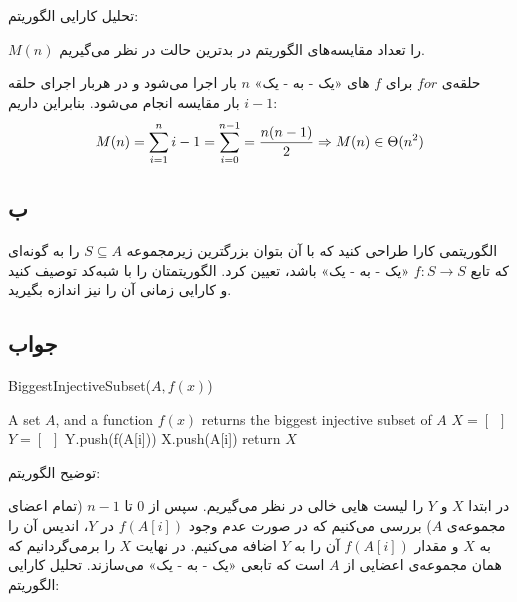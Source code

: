 \documentclass[]{article}
\begin{document}
    تحلیل کارایی الگوریتم:
    
    $M(n)$
    را تعداد مقایسه‌های الگوریتم در بدترین حالت در نظر می‌گیریم.
    
    حلقه‌ی 
    $for$
    برای 
    $f$
    های «یک - به - یک»
    $n$
    بار اجرا می‌شود و در هربار اجرای حلقه 
    $i-1$
    بار مقایسه انجام می‌شود. بنابراین داریم:
    $$\displaystyle M(n) = \sum_{i=1}^n i - 1 = \sum_{i=0}^{n-1} = \frac{n(n-1)}{2}\\
    \Rightarrow M(n) \in \Theta(n^2)$$
    
    
    \pagebreak
    \subsection{ب}
    الگوریتمی کارا طراحی کنید که با آن بتوان بزرگترین زیرمجموعه 
    $S \subseteq A$
    را به گونه‌ای که تابع
    $f: S \rightarrow S$
    «یک - به - یک» باشد، تعیین کرد. الگوریتمتان را با شبه‌کد توصیف کنید و کارایی زمانی آن را نیز اندازه بگیرید.
    \subsection*{جواب}
    \begin{latin}
        \begin{algorithm}
        \caption{BiggestInjectiveSubset($A, f(x)$)}
            \begin{algorithmic}
                \Require A set $A$, and a function $f(x)$
                \Ensure returns the biggest injective subset of $A$ 
                \State $X = [\, \, \,]$
                \State $Y = [\, \, \,]$
                        \State Y.push(f(A[i]))
                        \State X.push(A[i])
                    \EndIf
                \EndFor
                \State return $X$ 
            \end{algorithmic}
        \end{algorithm}
    \end{latin}
    توضیح الگوریتم:
    
    در ابتدا
    $X$
    و
    $Y$
    را لیست هایی خالی در نظر می‌گیریم.
    سپس از 
    $0$
    تا
    $n-1$
    (تمام اعضای مجموعه‌ی
    $A$)
    بررسی می‌کنیم که در صورت عدم وجود
    $f(A[i])$
    در
    $Y$،
    اندیس آن را به
    $X$
    و مقدار
    $f(A[i])$
    آن را به
    $Y$
    اضافه می‌کنیم.
    در نهایت
    $X$
    را برمی‌گردانیم که همان مجموعه‌ی اعضایی از 
    $A$
    است که تابعی
    «یک - به - یک»
    می‌سازند.
    تحلیل کارایی الگوریتم:
    
\end{document}
